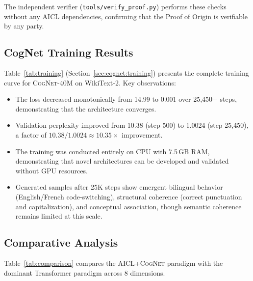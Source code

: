 \documentclass[11pt]{article}
\newcommand{\aicl}{\textsc{AICL}}
\newcommand{\cognet}{\textsc{CogNet}}
\newcommand{\proofoforigin}{Proof of Origin}
\begin{document}
The independent verifier (\texttt{tools/verify\_proof.py}) performs these checks without any \aicl{} dependencies, confirming that the \proofoforigin{} is verifiable by any party.

\subsection{CogNet Training Results}
\label{sec:experiments:cognet}

Table~\ref{tab:training} (Section~\ref{sec:cognet:training}) presents the complete training curve for \cognet{}-40M on WikiText-2. Key observations:
\begin{itemize}[leftmargin=*,itemsep=2pt]
  \item The loss decreased monotonically from 14.99 to 0.001 over 25,450+ steps, demonstrating that the architecture converges.
  \item Validation perplexity improved from 10.38 (step 500) to 1.0024 (step 25,450), a factor of $10.38 / 1.0024 \approx 10.35\times$ improvement.
  \item The training was conducted entirely on CPU with 7.5\,GB RAM, demonstrating that novel architectures can be developed and validated without GPU resources.
  \item Generated samples after 25K steps show emergent bilingual behavior (English/French code-switching), structural coherence (correct punctuation and capitalization), and conceptual association, though semantic coherence remains limited at this scale.
\end{itemize}

\subsection{Comparative Analysis}
\label{sec:experiments:comparison}

Table~\ref{tab:comparison} compares the \aicl{}+\cognet{} paradigm with the dominant Transformer paradigm across 8 dimensions.
\end{document}
